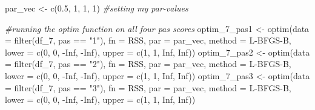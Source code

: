 \documentclass[
]{article}
\newenvironment{Shaded}{\begin{snugshade}}{\end{snugshade}}
\newcommand{\AttributeTok}[1]{\textcolor[rgb]{0.77,0.63,0.00}{#1}}
\newcommand{\CommentTok}[1]{\textcolor[rgb]{0.56,0.35,0.01}{\textit{#1}}}
\newcommand{\ConstantTok}[1]{\textcolor[rgb]{0.00,0.00,0.00}{#1}}
\newcommand{\DecValTok}[1]{\textcolor[rgb]{0.00,0.00,0.81}{#1}}
\newcommand{\FloatTok}[1]{\textcolor[rgb]{0.00,0.00,0.81}{#1}}
\newcommand{\FunctionTok}[1]{\textcolor[rgb]{0.00,0.00,0.00}{#1}}
\newcommand{\NormalTok}[1]{#1}
\newcommand{\OtherTok}[1]{\textcolor[rgb]{0.56,0.35,0.01}{#1}}
\newcommand{\SpecialCharTok}[1]{\textcolor[rgb]{0.00,0.00,0.00}{#1}}
\newcommand{\StringTok}[1]{\textcolor[rgb]{0.31,0.60,0.02}{#1}}
\begin{document}
\begin{Shaded}
\begin{Highlighting}[]
\NormalTok{par\_vec }\OtherTok{\textless{}{-}} \FunctionTok{c}\NormalTok{(}\FloatTok{0.5}\NormalTok{, }\DecValTok{1}\NormalTok{, }\DecValTok{1}\NormalTok{, }\DecValTok{1}\NormalTok{) }\CommentTok{\#setting my par{-}values}

\CommentTok{\#running the optim function on all four pas scores}
\NormalTok{optim\_7\_pas1 }\OtherTok{\textless{}{-}} \FunctionTok{optim}\NormalTok{(}\AttributeTok{data =} \FunctionTok{filter}\NormalTok{(df\_7, pas }\SpecialCharTok{==} \StringTok{"1"}\NormalTok{), }\AttributeTok{fn =}\NormalTok{ RSS, }\AttributeTok{par =}\NormalTok{ par\_vec, }\AttributeTok{method =} \StringTok{\textquotesingle{}L{-}BFGS{-}B\textquotesingle{}}\NormalTok{, }\AttributeTok{lower =} \FunctionTok{c}\NormalTok{(}\DecValTok{0}\NormalTok{, }\DecValTok{0}\NormalTok{, }\SpecialCharTok{{-}}\ConstantTok{Inf}\NormalTok{, }\SpecialCharTok{{-}}\ConstantTok{Inf}\NormalTok{), }\AttributeTok{upper =} \FunctionTok{c}\NormalTok{(}\DecValTok{1}\NormalTok{, }\DecValTok{1}\NormalTok{, }\ConstantTok{Inf}\NormalTok{, }\ConstantTok{Inf}\NormalTok{))}
\NormalTok{optim\_7\_pas2 }\OtherTok{\textless{}{-}} \FunctionTok{optim}\NormalTok{(}\AttributeTok{data =} \FunctionTok{filter}\NormalTok{(df\_7, pas }\SpecialCharTok{==} \StringTok{"2"}\NormalTok{), }\AttributeTok{fn =}\NormalTok{ RSS, }\AttributeTok{par =}\NormalTok{ par\_vec, }\AttributeTok{method =} \StringTok{\textquotesingle{}L{-}BFGS{-}B\textquotesingle{}}\NormalTok{, }\AttributeTok{lower =} \FunctionTok{c}\NormalTok{(}\DecValTok{0}\NormalTok{, }\DecValTok{0}\NormalTok{, }\SpecialCharTok{{-}}\ConstantTok{Inf}\NormalTok{, }\SpecialCharTok{{-}}\ConstantTok{Inf}\NormalTok{), }\AttributeTok{upper =} \FunctionTok{c}\NormalTok{(}\DecValTok{1}\NormalTok{, }\DecValTok{1}\NormalTok{, }\ConstantTok{Inf}\NormalTok{, }\ConstantTok{Inf}\NormalTok{))}
\NormalTok{optim\_7\_pas3 }\OtherTok{\textless{}{-}} \FunctionTok{optim}\NormalTok{(}\AttributeTok{data =} \FunctionTok{filter}\NormalTok{(df\_7, pas }\SpecialCharTok{==} \StringTok{"3"}\NormalTok{), }\AttributeTok{fn =}\NormalTok{ RSS, }\AttributeTok{par =}\NormalTok{ par\_vec, }\AttributeTok{method =} \StringTok{\textquotesingle{}L{-}BFGS{-}B\textquotesingle{}}\NormalTok{, }\AttributeTok{lower =} \FunctionTok{c}\NormalTok{(}\DecValTok{0}\NormalTok{, }\DecValTok{0}\NormalTok{, }\SpecialCharTok{{-}}\ConstantTok{Inf}\NormalTok{, }\SpecialCharTok{{-}}\ConstantTok{Inf}\NormalTok{), }\AttributeTok{upper =} \FunctionTok{c}\NormalTok{(}\DecValTok{1}\NormalTok{, }\DecValTok{1}\NormalTok{, }\ConstantTok{Inf}\NormalTok{, }\ConstantTok{Inf}\NormalTok{))}

\end{Highlighting}
\end{Shaded}
\end{document}
